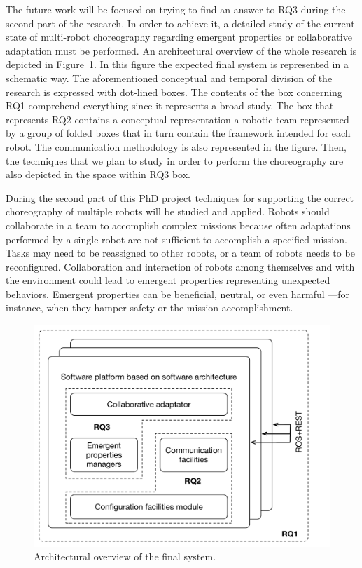 The future work will be focused on trying to find an answer to RQ3 during the second part of the research.
In order to achieve it, a detailed study of the current state of multi-robot choreography regarding emergent properties or collaborative adaptation must be performed.
An architectural overview of the whole research is depicted in Figure~\ref{fig:overview}.
In this figure the expected final system is represented in a schematic way.
The aforementioned conceptual and temporal division of the research is expressed with dot-lined boxes.
The contents of the box concerning RQ1 comprehend everything since it represents a broad study.
The box that represents RQ2 contains a conceptual representation a robotic team represented by a group of folded boxes that in turn contain the framework intended for each robot.
The communication methodology is also represented in the figure.
Then, the techniques that we plan to study in order to perform the choreography are also depicted in the space within RQ3 box.

During the second part of this PhD project techniques for supporting the correct choreography of multiple robots will be studied and applied.
Robots should collaborate in a team to accomplish complex missions because often adaptations performed by a single robot are not sufficient to accomplish a specified mission. 
Tasks may need to be reassigned to other robots, or a team of robots needs to be reconfigured. 
Collaboration and interaction of robots among themselves and with the environment could lead to emergent properties representing unexpected behaviors. Emergent properties can be beneficial, neutral, or even harmful ---for instance, when they hamper safety or the mission accomplishment.

\begin{figure}[!t]
\begin{center}
\includegraphics[width=1\linewidth]{Figures/research.pdf}
\caption{Architectural overview of the final system.}
\label{fig:overview}
\end{center}
\end{figure}